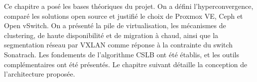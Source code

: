 \par Ce chapitre a posé les bases théoriques du projet. On a défini l'hyperconvergence, comparé les solutions open source et justifié le choix de Proxmox VE, Ceph et Open vSwitch. On a présenté la pile de virtualisation, les mécanismes de clustering, de haute disponibilité et de migration à chaud, ainsi que la segmentation réseau par VXLAN comme réponse à la contrainte du switch Sonatrach. Les fondements de l'algorithme CSLB ont été établis, et les outils complémentaires ont été présentés. Le chapitre suivant détaille la conception de l'architecture proposée.\\
